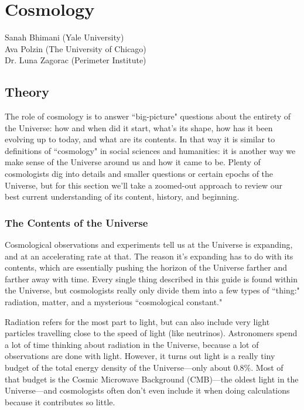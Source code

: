 \section{Cosmology}
\begin{sectionauthor}
    Sanah Bhimani (Yale University) \\
    Ava Polzin (The University of Chicago) \\
    Dr. Luna Zagorac (Perimeter Institute)
\end{sectionauthor}


\subsection{Theory}

The role of cosmology is to answer ``big-picture" questions about the entirety of the Universe: how and when did it start, what's its shape, how has it been evolving up to today, and what are its contents. In that way it is similar to definitions of ``cosmology" in social sciences and humanities: it is another way we make sense of the Universe around us and how it came to be. Plenty of cosmologists dig into details and smaller questions or certain epochs of the Universe, but for this section we'll take a zoomed-out approach to review our best current understanding of its content, history, and beginning. 

\subsubsection{The Contents of the Universe}

Cosmological observations and experiments tell us at the Universe is expanding, and at an accelerating rate at that. The reason it's expanding has to do with its contents, which are essentially pushing the horizon of the Universe farther and farther away with time. Every single thing described in this guide is found within the Universe, but cosmologists really only divide them into a few types of ``thing:" radiation, matter, and a mysterious ``cosmological constant."

Radiation refers for the most part to light, but can also include very light particles travelling close to the speed of light (like neutrinos). Astronomers spend a lot of time thinking about radiation in the Universe, because a lot of observations are done with light. However, it turns out light is a really tiny budget of the total energy density of the Universe---only about 0.8\%. Most of that budget is the Cosmic Microwave Background (CMB)---the oldest light in the Universe---and cosmologists often don't even include it when doing calculations because it contributes so little. 


